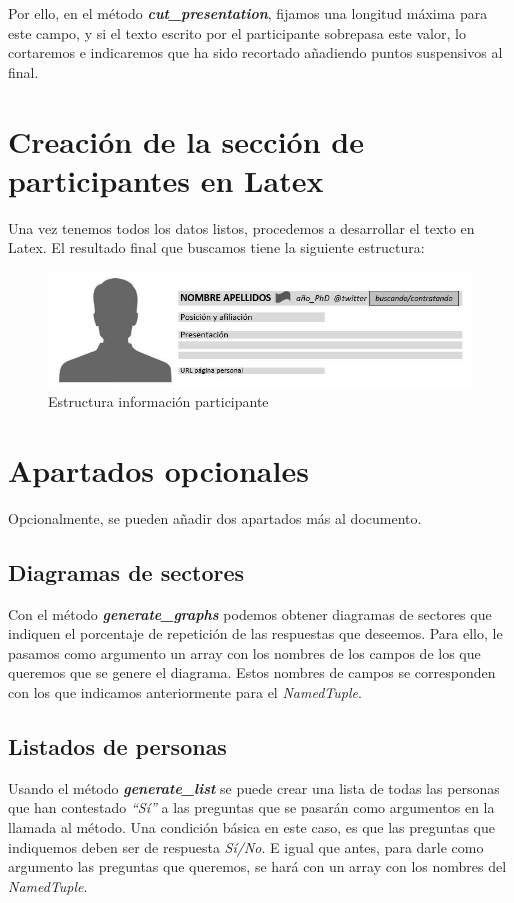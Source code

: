 \documentclass[a4paper, 12pt]{book}
\begin{document}
Por ello, en el método \textbf{\textit{cut\_presentation}}, fijamos una longitud máxima para este campo, y si el texto escrito por el participante sobrepasa este valor, lo cortaremos e indicaremos que ha sido recortado añadiendo puntos suspensivos al final.


\section{Creación de la sección de participantes en Latex}
\label{sec:creaParticipantes}
Una vez tenemos todos los datos listos, procedemos a desarrollar el texto en Latex. El resultado final que buscamos tiene la siguiente estructura:
\begin{figure}[h!]
	\centering
	\includegraphics[width=15cm, keepaspectratio]{img/esquemaLatex}
	\caption{Estructura información participante}
	\label{fig:ejemploLatex}
\end{figure}


\section{Apartados opcionales}
\label{sec:opcional}
Opcionalmente, se pueden añadir dos apartados más al documento.

\subsection{Diagramas de sectores}
\label{subsec:diagramas}
Con el método \textbf{\textit{generate\_graphs}} podemos obtener diagramas de sectores que indiquen el porcentaje de repetición de las respuestas que deseemos. Para ello, le pasamos como argumento un array con los nombres de los campos de los que queremos que se genere el diagrama. Estos nombres de campos se corresponden con los que indicamos anteriormente para el \textit{NamedTuple}.

\subsection{Listados de personas}
\label{subsec:listados}
Usando el método \textbf{\textit{generate\_list}} se puede crear una lista de todas las personas que han contestado \textit{``Sí''} a las preguntas que se pasarán como argumentos en la llamada al método. Una condición básica en este caso, es que las preguntas que indiquemos deben ser de respuesta \textit{Sí/No}. E igual que antes, para darle como argumento las preguntas que queremos, se hará con un array con los nombres del \textit{NamedTuple}.
\end{document}
